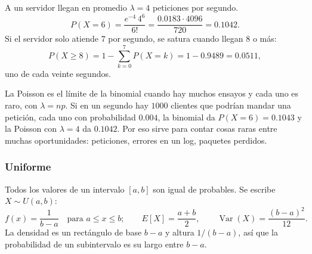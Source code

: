 \documentclass[11pt,letterpaper]{article}
\begin{document}
\begin{ejemplo}
    A un servidor llegan en promedio $\lambda = 4$ peticiones por
    segundo.
    \[
        P(X = 6) = \frac{e^{-4}\, 4^{6}}{6!}
                 = \frac{0.0183 \cdot 4096}{720} = 0.1042 .
    \]
    Si el servidor solo atiende $7$ por segundo, se satura cuando
    llegan $8$ o más:
    \[
        P(X \ge 8) = 1 - \sum_{k=0}^{7} P(X = k) = 1 - 0.9489 = 0.0511 ,
    \]
    uno de cada veinte segundos.
    \begin{center}
    \end{center}
\end{ejemplo}

\begin{idea}
    La Poisson es el límite de la binomial cuando hay muchos ensayos y
    cada uno es raro, con $\lambda = np$. Si en un segundo hay
    $1000$ clientes que podrían mandar una petición, cada uno con
    probabilidad $0.004$, la binomial da $P(X = 6) = 0.1043$ y la
    Poisson con $\lambda = 4$ da $0.1042$. Por eso sirve para contar
    cosas raras entre muchas oportunidades: peticiones, errores en un
    log, paquetes perdidos.
\end{idea}

\subsubsection*{Uniforme}

Todos los valores de un intervalo $[a, b]$ son igual de probables. Se
escribe $X \sim U(a, b)$:
\[
    f(x) = \frac{1}{b - a} \quad \text{para } a \le x \le b ;
    \qquad E[X] = \frac{a + b}{2} , \qquad
    \operatorname{Var}(X) = \frac{(b - a)^2}{12} .
\]
La densidad es un rectángulo de base $b - a$ y altura $1/(b - a)$, así
que la probabilidad de un subintervalo es su largo entre $b - a$.
\end{document}
